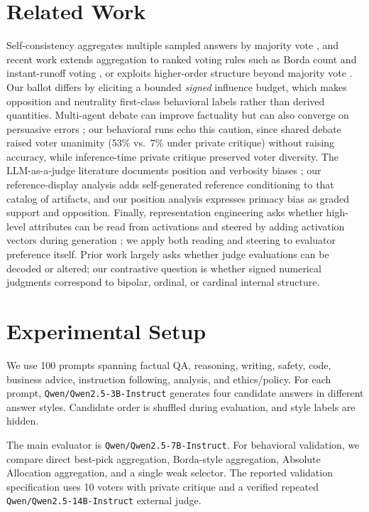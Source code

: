\documentclass[11pt]{article}
\begin{document}
\section{Related Work}

Self-consistency aggregates multiple sampled answers by majority vote
\cite{wang2022selfconsistency}, and recent work extends aggregation to ranked
voting rules such as Borda count and instant-runoff voting
\cite{wang2025rankedvoting}, or exploits higher-order structure beyond
majority vote \cite{ai2025higherorder}. Our ballot differs by eliciting a
bounded \emph{signed} influence budget, which makes opposition and neutrality
first-class behavioral labels rather than derived quantities. Multi-agent
debate can improve factuality but can also converge on persuasive errors
\cite{du2023debate}; our behavioral runs echo this caution, since shared
debate raised voter unanimity (53\% vs.\ 7\% under private critique) without
raising accuracy, while inference-time private critique
\cite{bai2022constitutional} preserved voter diversity. The LLM-as-a-judge
literature documents position and verbosity biases
\cite{zheng2023judging,wang2023fair}; our reference-display analysis adds
self-generated reference conditioning to that catalog of artifacts, and our position
analysis expresses primacy bias as graded support and opposition. Finally,
representation engineering asks whether high-level attributes can be read
from activations \cite{zou2023representation,zhang2023rahf} and steered by
adding activation vectors during generation \cite{turner2023activation}; we
apply both reading and steering to evaluator preference itself. Prior work
largely asks whether judge evaluations can be decoded or altered; our
contrastive question is whether signed numerical judgments correspond to
bipolar, ordinal, or cardinal internal structure.

\section{Experimental Setup}

We use 100 prompts spanning factual QA, reasoning, writing, safety, code,
business advice, instruction following, analysis, and ethics/policy. For each
prompt, \texttt{Qwen/Qwen2.5-3B-Instruct} generates four candidate answers in
different answer styles. Candidate order is shuffled during evaluation, and
style labels are hidden.

The main evaluator is \texttt{Qwen/Qwen2.5-7B-Instruct}. For behavioral
validation, we compare direct best-pick aggregation, Borda-style aggregation,
Absolute Allocation aggregation, and a single weak selector. The reported
validation specification uses 10 voters with private critique and a verified repeated
\texttt{Qwen/Qwen2.5-14B-Instruct} external judge.
\end{document}
